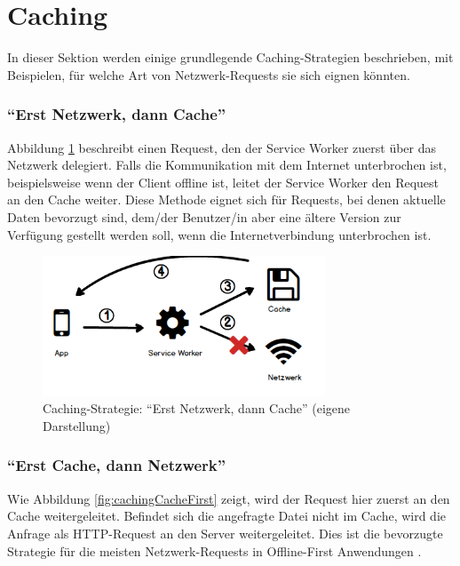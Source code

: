 \documentclass[a4paper, 12pt]{scrreprt}
\begin{document}
\section{Caching}
In dieser Sektion werden einige grundlegende Caching-Strategien beschrieben, mit Beispielen, für welche Art von Netzwerk-Requests sie sich eignen könnten.

\subsubsection{\enquote{Erst Netzwerk, dann Cache}}
Abbildung \ref{fig:cachingNetworkFirst} beschreibt einen Request, den der Service Worker zuerst über das Netzwerk delegiert. Falls die Kommunikation mit dem Internet unterbrochen ist, beispielsweise wenn der Client offline ist, leitet der Service Worker den Request an den Cache weiter. Diese Methode eignet sich für Requests, bei denen aktuelle Daten bevorzugt sind, dem/der Benutzer/in aber eine ältere Version zur Verfügung gestellt werden soll, wenn die Internetverbindung unterbrochen ist.

\begin{figure}[H]
	\centering
	\includegraphics[width=0.75\textwidth]{networkfirst.png}
	\caption[Caching-Strategie: \enquote{Erst Netzwerk, dann Cache}]{Caching-Strategie: \enquote{Erst Netzwerk, dann Cache} (eigene Darstellung)}
	\label{fig:cachingNetworkFirst}
\end{figure}



\subsubsection{\enquote{Erst Cache, dann Netzwerk}}
\label{sec:cachedannnetzwerk}
Wie Abbildung \ref{fig:cachingCacheFirst} zeigt, wird der Request hier zuerst an den Cache weitergeleitet. Befindet sich die angefragte Datei nicht im Cache, wird die Anfrage als \ac{HTTP}-Request an den Server weitergeleitet. Dies ist die bevorzugte Strategie für die meisten Netzwerk-Requests in Offline-First Anwendungen \autocite[Kapitel 05]{BookBuildingPWAs}.
\end{document}
